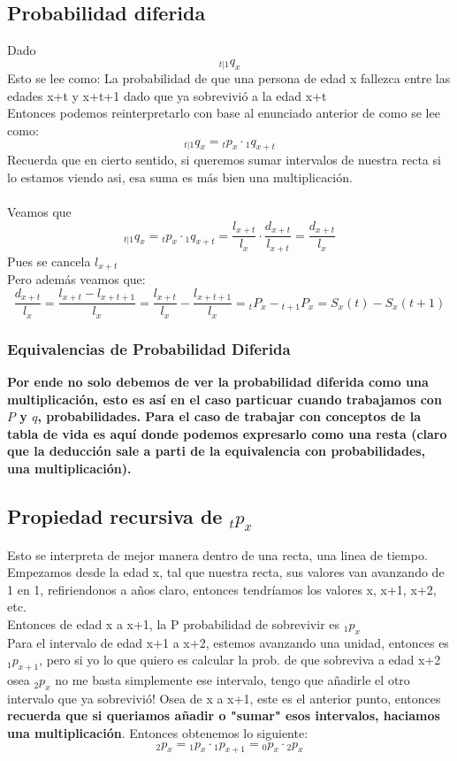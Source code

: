 \documentclass{article}
\begin{document}
\subsection*{Probabilidad diferida}
Dado \[{}_{t|1}q_x\]
Esto se lee como: La probabilidad de que una persona de edad x fallezca entre las edades x+t y x+t+1 dado que ya sobrevivió a la edad x+t
\\
Entonces podemos reinterpretarlo con base al enunciado anterior de como se lee como:
\[{}_{t|1}q_x = {}_tp_x \cdot {}_1q_{x+t}\]
Recuerda que en cierto sentido, si queremos sumar intervalos de nuestra recta si lo estamos viendo asi, esa suma es más bien una multiplicación.
\\\\
Veamos que \[{}_{t|1}q_x = {}_tp_x \cdot {}_1q_{x+t} = \frac{l_{x+t}}{l_x} \cdot \frac{d_{x+t}}{l_{x+t}}=\frac{d_{x+t}}{l_x}\] Pues se cancela \(l_{x+t}\)
\\
Pero además veamos que:
\[\frac{d_{x+t}}{l_x} = \frac{l_{x+t}-l_{x+t+1}}{l_x} = \frac{l_{x+t}}{l_x}- \frac{l_{x+t+1}}{l_x} = {}_tP_x - {}_{t+1}P_x = S_x(t)-S_x(t+1)\]

\subsubsection*{Equivalencias de Probabilidad Diferida}
\textbf{Por ende no solo debemos de ver la probabilidad diferida como una multiplicación, esto es así en el caso particuar cuando trabajamos con \(P\) y \(q\), probabilidades. Para el caso de trabajar con conceptos de la tabla de vida es aquí donde podemos expresarlo como una resta (claro que la deducción sale a parti de la equivalencia con probabilidades, una multiplicación).}

\subsection*{Propiedad recursiva de \({}_tp_x\)}
Esto se interpreta de mejor manera dentro de una recta, una linea de tiempo.
Empezamos desde la edad x, tal que nuestra recta, sus valores van avanzando de 1 en 1, refiriendonos a años claro, entonces tendríamos los valores x, x+1, x+2, etc.
\\

Entonces de edad x a x+1, la P probabilidad de sobrevivir es \({}_1p_x\)
\\

Para el intervalo de edad x+1 a x+2, estemos avanzando una unidad, entonces es \({}_1p_{x+1}\), pero si yo lo que quiero es calcular la prob. de que sobreviva a edad x+2 osea \({}_2p_x\) no me basta simplemente ese intervalo, tengo que añadirle el otro intervalo que ya sobrevivió! Osea de x a x+1, este es el anterior punto, entonces \textbf{recuerda que si queriamos añadir o "sumar" esos intervalos, haciamos una multiplicación}. Entonces obtenemos lo siguiente: \[{}_2p_{x} = {}_1p_x \cdot {}_1p_{x+1} = {}_0p_x \cdot {}_2p_x\]
\end{document}
